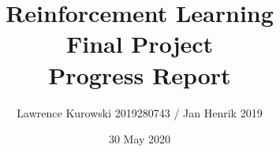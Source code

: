 \documentclass[a4paper,twoside,12pt,fleqn]{scrartcl}
\begin{document}
\title{Reinforcement Learning\\Final Project\\Progress Report}
\subtitle{Lawrence Kurowski 2019280743 / Jan Henrik 2019}
\date{30 May 2020}
\maketitle


%
%

%
\end{document}
